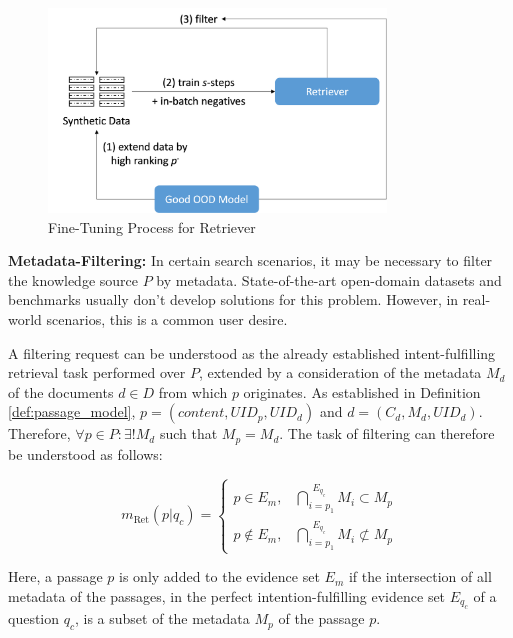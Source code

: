 \begin{figure}[H]
   \centering
    \includegraphics[width=0.8\textwidth]{Grafiken/Training.png}
    \caption{Fine-Tuning Process for Retriever}
    \label{fig:retriever-fine-tuning} 
\end{figure}

\vspace{\baselineskip}

\textbf{Metadata-Filtering:} In certain search scenarios, it may be necessary to filter the knowledge source $P$ by metadata. State-of-the-art open-domain datasets and benchmarks usually don't develop solutions for this problem. However, in real-world scenarios, this is a common user desire.

A filtering request can be understood as the already established intent-fulfilling retrieval task performed over $P$, extended by a consideration of the metadata $M_d$ of the documents $d \in D$ from which $p$ originates. As established in Definition \ref{def:passage_model}, $p = (content, UID_p, UID_d)$ and $d = (C_d, M_d, UID_d)$. Therefore, $\forall p \in P: \exists! M_d$ such that $M_p = M_d$. The task of filtering can therefore be understood as follows:

\begin{equation}
    m_{\text{Ret}}(p|q_c) =
    \begin{cases}
        p \in E_m, & \bigcap\limits_{i=p_1}^{\substack{E_{q_c}}} M_{i} \subset M_p \\
        p \notin E_m, & \bigcap\limits_{i=p_1}^{\substack{E_{q_c}}} M_{i} \not\subset M_p
    \end{cases}
\end{equation}

Here, a passage $p$ is only added to the evidence set $E_m$ if the intersection of all metadata of the passages, in the perfect intention-fulfilling evidence set $E_{q_c}$ of a question $q_c$, is a subset of the metadata $M_p$ of the passage $p$.

